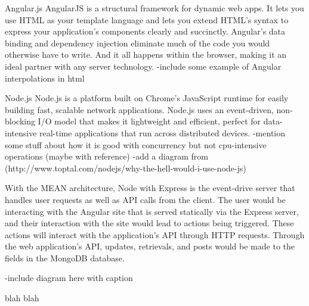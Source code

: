 \documentclass[12pt]{article}
\begin{document}
Angular.js %
AngularJS is a structural framework for dynamic web apps. It lets you use HTML as your template language and lets you extend HTML's syntax to express your application's components clearly and succinctly. Angular's data binding and dependency injection eliminate much of the code you would otherwise have to write. And it all happens within the browser, making it an ideal partner with any server technology.
-include some example of Angular interpolations in html

Node.js %
Node.js is a platform built on Chrome's JavaScript runtime for easily building fast, scalable network applications. Node.js uses an event-driven, non-blocking I/O model that makes it lightweight and efficient, perfect for data-intensive real-time applications that run across distributed devices.
-mention some stuff about how it is good with concurrency but not cpu-intensive operations (maybe with reference)
-add a diagram from (http://www.toptal.com/nodejs/why-the-hell-would-i-use-node-js)

With the MEAN architecture, Node with Express is the event-drive server that handles user requests as well as API calls from the client. The user would be interacting with the Angular site that is served statically via the Express server, and their interaction with the site would lead to actions being triggered. These actions will interact with the application's API through HTTP requests. Through the web application's API, updates, retrievals, and posts would be made to the fields in the MongoDB database.

-include diagram here with caption

\newpage

blah blah

\newpage
\end{document}
